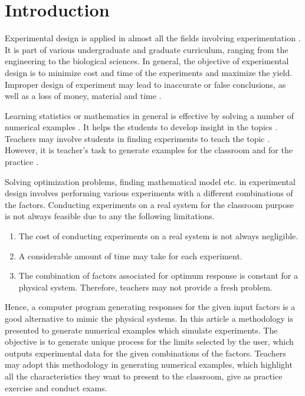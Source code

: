 \documentclass[twocolumn]{svjour3}          %
\begin{document}
\section{Introduction}
Experimental design is applied in almost all the fields involving experimentation \cite{fisher1937design,quinn2002experimental,montgomery2008design,antony2014design}. It is part of various undergraduate and graduate curriculum, ranging from the engineering to the biological sciences. In general, the objective of experimental design is to minimize cost and time of the experiments and maximize the yield. Improper design of experiment may lead to inaccurate or false conclusions, as well as a loss of money, material and time \cite{Festing2003341}.
\par
Learning statistics or mathematics in general is effective by solving a number of numerical examples \cite{zhu1987learning}. It helps the students to develop insight in the topics \cite{renkl1997learning}. Teachers may involve students in finding experiments to teach the topic \cite{Hunter1977Some,fried2006mathematics,Hiebert82}. However, it is teacher's task to generate examples for the classroom and for the practice \cite{Deborah2008}.
\par
Solving optimization problems, finding mathematical model etc. in experimental design involves performing various experiments with a different combinations of the factors. Conducting experiments on a real system for the classroom purpose is not always feasible due to any the following limitations.
\begin{enumerate}
	\item The cost of conducting experiments on a real system is not always negligible.
	\item A considerable amount of time may take for each experiment.
	\item The combination of factors associated for optimum response is constant for a physical system. Therefore, teachers may not provide a fresh problem.
\end{enumerate}
\par
Hence, a computer program generating responses for the given input factors is a good alternative to mimic the physical systems. In this article a methodology is presented to generate numerical examples which simulate experiments. The objective is to generate unique process for the limits selected by the user, which outputs experimental data for the given combinations of the factors. Teachers may adopt this methodology in generating numerical examples, which highlight all the characteristics they want to present to the classroom, give as practice exercise and conduct exams.
\end{document}
